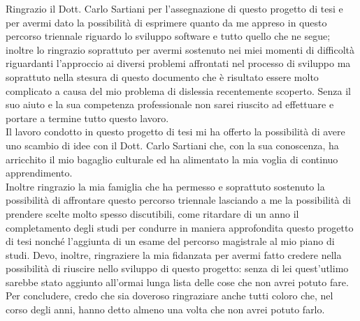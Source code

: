 \documentclass[11pt, a4paper, titlepage]{toptesi}
\makeatletter
\theoremstyle{definition}
\newcommand\listofcodes{%
 \iffrontmatter\else\frontmattertrue\fi
 \if@openright\cleardoublepage\else\clearpage\fi
 \begingroup\def\chapter##1{\@schapter}
 \phantomsection %
 \lstlistoflistings
 \endgroup
}
\makeatother
\begin{document}









\ringraziamenti
Ringrazio il Dott. Carlo Sartiani per l'assegnazione di questo progetto di tesi e per avermi dato la possibilità di esprimere quanto da me appreso in questo percorso triennale riguardo lo sviluppo software e tutto quello che ne segue; inoltre lo ringrazio soprattuto per avermi sostenuto nei miei momenti di difficoltà riguardanti l'approccio ai diversi problemi affrontati nel processo di sviluppo ma soprattuto nella stesura di questo documento che è risultato essere molto complicato a causa del mio problema di dislessia recentemente scoperto.
Senza il suo aiuto e la sua competenza professionale non sarei riuscito ad effettuare e portare a termine tutto questo lavoro.\\
Il lavoro condotto in questo progetto di tesi mi ha offerto la possibilità di avere uno scambio di idee con il Dott. Carlo Sartiani che, con la sua conoscenza, ha arricchito il mio bagaglio culturale ed ha alimentato la mia voglia di continuo apprendimento.\\
Inoltre ringrazio la mia famiglia che ha permesso e soprattuto sostenuto la possibilità di affrontare questo percorso triennale lasciando a me la possibilità di prendere scelte molto spesso discutibili, come ritardare di un anno il completamento degli studi per condurre in maniera approfondita questo progetto di tesi nonché l'aggiunta di un esame del percorso magistrale al mio piano di studi. Devo, inoltre, ringraziere la mia fidanzata per avermi fatto credere nella possibilità di riuscire nello sviluppo di questo progetto: senza di lei quest'utlimo sarebbe stato aggiunto all'ormai lunga lista delle cose che non avrei potuto fare.\\
Per concludere, credo che sia doveroso ringraziare anche tutti coloro  che, nel corso degli anni, hanno detto almeno una volta che non avrei potuto farlo.


\appendix




\listoffigures

\listoftables

\listofcodes


{}
\nocite{*}
\printbibliography
\end{document}
